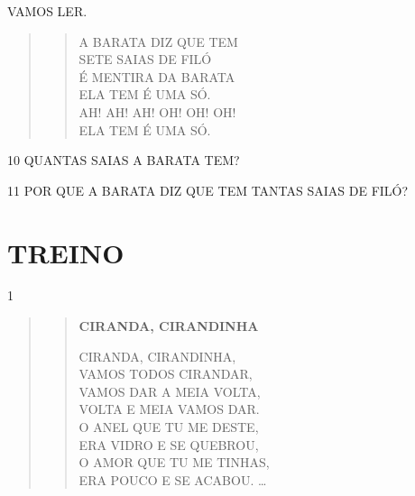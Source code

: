 VAMOS LER.

\begin{quote}
\begin{verse}
A BARATA DIZ QUE TEM\\
SETE SAIAS DE FILÓ\\
É MENTIRA DA BARATA\\
ELA TEM É UMA SÓ.\\
AH! AH! AH! OH! OH! OH!\\
ELA TEM É UMA SÓ.
\end{verse}

\end{quote}

\num{10} QUANTAS SAIAS A BARATA TEM?


\num{11} POR QUE A BARATA DIZ QUE TEM TANTAS SAIAS DE FILÓ?


\section{TREINO}


\num{1}

\begin{minipage}{.8\textwidth}
\begin{quote}
\begin{verse}
\textbf{CIRANDA, CIRANDINHA}

CIRANDA, CIRANDINHA,\\
VAMOS TODOS CIRANDAR,\\
VAMOS DAR A MEIA VOLTA,\\
VOLTA E MEIA VAMOS DAR.\\
O ANEL QUE TU ME DESTE,\\
ERA VIDRO E SE QUEBROU,\\
O AMOR QUE TU ME TINHAS,\\
ERA POUCO E SE ACABOU. \ldots{}
\end{verse}%
\end{quote}
\end{minipage}
\begin{minipage}{.2\textwidth}
\end{minipage}

